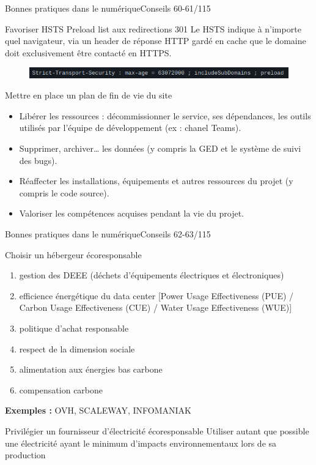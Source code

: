 

\begin{frame}{Bonnes pratiques dans le numérique}{Conseils 60-61/115}
\begin{block}{Favoriser HSTS Preload list aux redirections 301}
Le HSTS indique à n’importe quel navigateur, via un header de réponse HTTP gardé en cache que le domaine doit exclusivement être contacté en HTTPS.
\begin{figure}
    \centering
    \includegraphics[scale=0.45]{chapitre2/wdd6/fig/c1.png}
\end{figure}
\end{block}

\begin{block}{Mettre en place un plan de fin de vie du site}
\begin{itemize}
    \item Libérer les ressources : décommissionner le service, ses dépendances, les outils utilisés par l’équipe de développement (ex : chanel Teams).
    \item Supprimer, archiver… les données (y compris la GED et le système de suivi des bugs).
    \item Réaffecter les installations, équipements et autres ressources du projet (y compris le code source).
    \item Valoriser les compétences acquises pendant la vie du projet.
\end{itemize}
\end{block}

\end{frame}


\begin{frame}{Bonnes pratiques dans le numérique}{Conseils 62-63/115}
\begin{block}{Choisir un hébergeur écoresponsable}
\begin{enumerate}
    \item gestion des DEEE (déchets d’équipements électriques et électroniques) 
    \item efficience énergétique du data center [Power Usage Effectiveness (PUE) / Carbon Usage Effectiveness (CUE) / Water Usage Effectiveness (WUE)] 
    \item politique d’achat responsable
    \item respect de la dimension sociale
    \item alimentation aux énergies bas carbone
    \item compensation carbone
\end{enumerate}
 \textbf{Exemples :}   OVH,
    SCALEWAY,
    INFOMANIAK

\end{block}

\begin{block}{Privilégier un fournisseur d'électricité écoresponsable}
Utiliser autant que possible une électricité ayant le minimum d'impacts environnementaux lors de sa production 
\end{block}
\end{frame}


